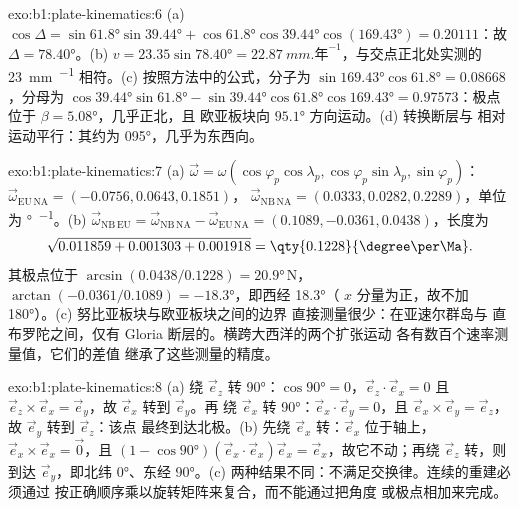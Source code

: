 \begin{solution}{exo:b1:plate-kinematics:6}
(a) $\cos\Delta = \sin\ang{61.8}\sin\ang{39.44} + \cos\ang{61.8}\cos\ang{39.44}
\cos(\ang{169.43}) = 0.20111$：故 $\Delta = \ang{78.40}$。(b) $v = 23.35
\sin\ang{78.40} = \qty{22.87}{mm.\text{年}^{-1}}$，与交点正北处实测的
\qty{23}{mm.^{-1}} 相符。(c) 按照方法中的公式，分子为
$\sin\ang{169.43}\cos\ang{61.8} = 0.08668$，分母为
$\cos\ang{39.44}\sin\ang{61.8} - \sin\ang{39.44}\cos\ang{61.8}\cos\ang{169.43}
= 0.97573$：极点位于 $\beta = \ang{5.08}$，几乎正北，且
欧亚板块向 $\ang{95.1}$ 方向运动。(d) 转换断层与
相对运动平行：其约为 \ang{095}，几乎为东西向。
\end{solution}

\begin{solution}{exo:b1:plate-kinematics:7}
(a) $\vec\omega = \omega(\cos\varphi_p\cos\lambda_p, \cos\varphi_p\sin\lambda_p,
\sin\varphi_p)$：$\vec\omega_{\mathrm{EU\,NA}} = (-0.0756, 0.0643, 0.1851)$，
$\vec\omega_{\mathrm{NB\,NA}} = (0.0333, 0.0282, 0.2289)$，单位为
\unit{\degree\per\Ma}。(b) $\vec\omega_{\mathrm{NB\,EU}} =
\vec\omega_{\mathrm{NB\,NA}} - \vec\omega_{\mathrm{EU\,NA}} = (0.1089, -0.0361,
0.0438)$，长度为
\[
  \sqrt{0.011859 + 0.001303 + 0.001918} = \qty{0.1228}{\degree\per\Ma}.
\]
其极点位于
$\arcsin(0.0438/0.1228) = \ang{20.9}$\,N，
$\arctan(-0.0361/0.1089) = \ang{-18.3}$，即西经 \ang{18.3}（
$x$ 分量为正，故不加 \ang{180}）。(c) 努比亚板块与欧亚板块之间的边界
直接测量很少：在亚速尔群岛与
直布罗陀之间，仅有 Gloria 断层的。横跨大西洋的两个扩张运动
各有数百个速率测量值，它们的差值
继承了这些测量的精度。
\end{solution}

\begin{solution}{exo:b1:plate-kinematics:8}
(a) 绕 $\vec e_z$ 转 \ang{90}：$\cos\ang{90} = 0$，$\vec e_z\cdot\vec e_x = 0$
且 $\vec e_z\times\vec e_x = \vec e_y$，故 $\vec e_x$ 转到 $\vec e_y$。再
绕 $\vec e_x$ 转 \ang{90}：$\vec e_x\cdot\vec e_y = 0$，且
$\vec e_x\times\vec e_y = \vec e_z$，故 $\vec e_y$ 转到 $\vec e_z$：该点
最终到达北极。(b) 先绕 $\vec e_x$ 转：$\vec e_x$ 位于轴上，
$\vec e_x\times\vec e_x = \vec 0$，且 $(1 - \cos\ang{90})(\vec e_x\cdot\vec e_x)
\vec e_x = \vec e_x$，故它不动；再绕 $\vec e_z$ 转，则到达
$\vec e_y$，即北纬 \ang{0}、东经 \ang{90}。(c) 两种结果不同：不满足交换律。连续的重建必须通过
按正确顺序乘以旋转矩阵来复合，而不能通过把角度
或极点相加来完成。
\end{solution}

